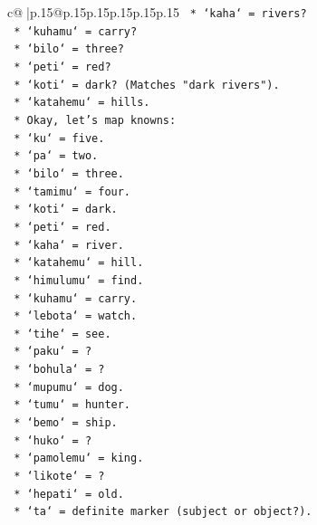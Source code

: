 \documentclass{article}
\begin{document}
{\begin{supertabular}{c@{$\;$}|p{.15\linewidth}@{}p{.15\linewidth}p{.15\linewidth}p{.15\linewidth}p{.15\linewidth}p{.15\linewidth}}
{{{\texttt{                    *   `kaha` = rivers?} \\
\texttt{                    *   `kuhamu` = carry?} \\
\texttt{                    *   `bilo` = three?} \\
\texttt{                    *   `peti` = red?} \\
\texttt{                    *   `koti` = dark? (Matches "dark rivers").} \\
\texttt{                    *   `katahemu` = hills.} \\
\texttt{                *   Okay, let's map knowns:} \\
\texttt{                    *   `ku` = five.} \\
\texttt{                    *   `pa` = two.} \\
\texttt{                    *   `bilo` = three.} \\
\texttt{                    *   `tamimu` = four.} \\
\texttt{                    *   `koti` = dark.} \\
\texttt{                    *   `peti` = red.} \\
\texttt{                    *   `kaha` = river.} \\
\texttt{                    *   `katahemu` = hill.} \\
\texttt{                    *   `himulumu` = find.} \\
\texttt{                    *   `kuhamu` = carry.} \\
\texttt{                    *   `lebota` = watch.} \\
\texttt{                    *   `tihe` = see.} \\
\texttt{                    *   `paku` = ?} \\
\texttt{                    *   `bohula` = ?} \\
\texttt{                    *   `mupumu` = dog.} \\
\texttt{                    *   `tumu` = hunter.} \\
\texttt{                    *   `bemo` = ship.} \\
\texttt{                    *   `huko` = ?} \\
\texttt{                    *   `pamolemu` = king.} \\
\texttt{                    *   `likote` = ?} \\
\texttt{                    *   `hepati` = old.} \\
\texttt{                    *   `ta` = definite marker (subject or object?).} \\
}}}
\end{supertabular}}
\end{document}
